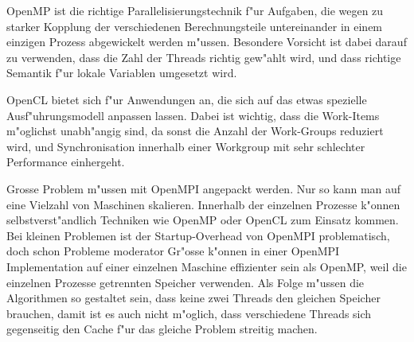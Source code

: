 OpenMP ist die richtige Parallelisierungstechnik f"ur Aufgaben, die
wegen zu starker Kopplung der verschiedenen Berechnungsteile untereinander
in einem einzigen Prozess abgewickelt werden m"ussen.
Besondere Vorsicht ist dabei darauf zu verwenden, dass die Zahl der
Threads richtig gew"ahlt wird, und dass richtige Semantik f"ur
lokale Variablen umgesetzt wird.

OpenCL bietet sich f"ur Anwendungen an, die sich auf das etwas spezielle
Ausf"uhrungsmodell anpassen lassen. Dabei ist wichtig, dass die
Work-Items m"oglichst unabh"angig sind, da sonst die Anzahl der Work-Groups
reduziert wird, und Synchronisation innerhalb einer Workgroup mit
sehr schlechter Performance einhergeht.

Grosse Problem m"ussen mit OpenMPI angepackt werden. Nur so kann man
auf eine Vielzahl von Maschinen skalieren. Innerhalb der einzelnen
Prozesse k"onnen selbstverst"andlich Techniken wie OpenMP oder OpenCL 
zum Einsatz kommen.
Bei kleinen Problemen ist der Startup-Overhead von OpenMPI problematisch,
doch schon Probleme moderator Gr"osse k"onnen in einer OpenMPI Implementation
auf einer einzelnen Maschine effizienter sein als OpenMP, weil die
einzelnen Prozesse getrennten Speicher verwenden. Als Folge m"ussen die
Algorithmen so gestaltet sein, dass keine zwei Threads den gleichen
Speicher brauchen, damit ist es auch nicht m"oglich, dass verschiedene
Threads sich gegenseitig den Cache f"ur das gleiche Problem streitig machen.


